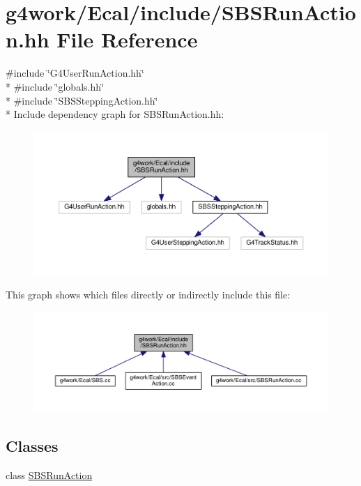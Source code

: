\hypertarget{_s_b_s_run_action_8hh}{\section{g4work/\-Ecal/include/\-S\-B\-S\-Run\-Action.hh File Reference}
\label{_s_b_s_run_action_8hh}
}
{\ttfamily \#include \char`\"{}G4\-User\-Run\-Action.\-hh\char`\"{}}\\*
{\ttfamily \#include \char`\"{}globals.\-hh\char`\"{}}\\*
{\ttfamily \#include \char`\"{}S\-B\-S\-Stepping\-Action.\-hh\char`\"{}}\\*
Include dependency graph for S\-B\-S\-Run\-Action.\-hh\-:\nopagebreak
\begin{figure}[H]
\begin{center}
\leavevmode
\includegraphics[width=350pt]{_s_b_s_run_action_8hh__incl}
\end{center}
\end{figure}
This graph shows which files directly or indirectly include this file\-:\nopagebreak
\begin{figure}[H]
\begin{center}
\leavevmode
\includegraphics[width=350pt]{_s_b_s_run_action_8hh__dep__incl}
\end{center}
\end{figure}
\subsection*{Classes}
\begin{DoxyCompactItemize}
\item 
class \hyperlink{class_s_b_s_run_action}{S\-B\-S\-Run\-Action}
\end{DoxyCompactItemize}
